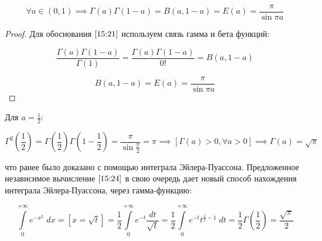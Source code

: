 \documentclass[../../main.tex]{subfiles}
\begin{document}
	
\begin{corollary*}
	\begin{equation}
	\label{15:21}
	\forall a \in (0,1) \implies \Gamma(a)\Gamma \left( 1-a\right)  = B\left( a,1-a\right) = E(a) = \frac{\pi}{\sin{\pi a}}
	\end{equation}
\end{corollary*}


\begin{proof}
	Для обоснования $\eqref{15:21}$ используем связь гамма и бета функций:
	
	\begin{equation}
	\label{15:22}
	\frac{\Gamma \left( a\right)\Gamma \left( 1-a\right)}{\Gamma \left( 1\right)} = \frac{\Gamma \left( a\right)\Gamma \left( 1-a\right)}{0!} = B \left( a,1-a\right)
	\end{equation}
	
	
	\begin{equation}
	\label{15:23}
	B \left( a,1-a\right) = E(a) = \frac{\pi}{\sin{\pi a}}
	\end{equation}
\end{proof}	

Для $a = \frac{1}{2}$:

\begin{equation}
\label{15:24}
\Gamma^2 \left( \frac{1}{2} \right) = \Gamma \left( \frac{1}{2} \right) \Gamma \left( 1-\frac{1}{2} \right) = \frac{\pi}{\sin{\frac{\pi}{2}}} = \pi \implies \left[ \Gamma(a) > 0, \forall a > 0\right] \implies \Gamma(a) = \sqrt{\pi}
\end{equation}

что ранее было доказано с помощью интеграла Эйлера-Пуассона. Предложенное независимое вычисление $\eqref{15:24}$ в свою очередь дает новый способ нахождения интеграла Эйлера-Пуассона, через гамма-функцию:

\[  \int\limits_{0}^{+\infty} e^{-x^2} \; dx = \left[ x = \sqrt{t} \right] =  \frac{1}{2} \int\limits_{0}^{+\infty} e^{-t} \frac{dt}{\sqrt{t}} = \frac{1}{2} \int\limits_{0}^{+\infty} e^{-t} t^{\frac{1}{2} - 1} \; dt = \frac{1}{2} \Gamma\left( \frac{1}{2} \right) = \frac{\sqrt{\pi}}{2}         \]
\end{document}
